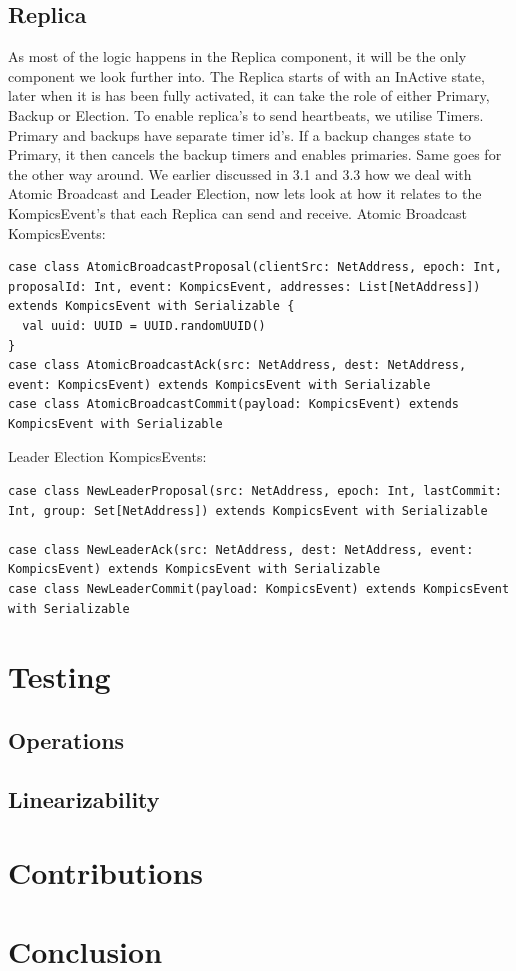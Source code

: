 \documentclass[12pt]{article}
\begin{document}
\subsection{Replica}
As most of the logic happens in the Replica component, it will be the only component we look further into.
\newline{}\newline{}
The Replica starts of with an InActive state, later when it is has been fully activated, it can take the role of either Primary, Backup or Election. To enable replica's to send heartbeats, we utilise Timers. Primary and backups have separate timer id's. If a backup changes state to Primary, it then cancels the backup timers and enables primaries. Same goes for the other way around. We earlier discussed in 3.1 and 3.3 how we deal with Atomic Broadcast and Leader Election, now lets look at how it relates to the KompicsEvent's that each Replica can send and receive.
\newline{}\newline{}
Atomic Broadcast KompicsEvents:
\begin{lstlisting}[style=myScalastyle]
case class AtomicBroadcastProposal(clientSrc: NetAddress, epoch: Int, proposalId: Int, event: KompicsEvent, addresses: List[NetAddress]) extends KompicsEvent with Serializable {
  val uuid: UUID = UUID.randomUUID()
}
case class AtomicBroadcastAck(src: NetAddress, dest: NetAddress, event: KompicsEvent) extends KompicsEvent with Serializable
case class AtomicBroadcastCommit(payload: KompicsEvent) extends KompicsEvent with Serializable

\end{lstlisting}
Leader Election KompicsEvents:
\begin{lstlisting}[style=myScalastyle]
case class NewLeaderProposal(src: NetAddress, epoch: Int, lastCommit: Int, group: Set[NetAddress]) extends KompicsEvent with Serializable

case class NewLeaderAck(src: NetAddress, dest: NetAddress, event: KompicsEvent) extends KompicsEvent with Serializable
case class NewLeaderCommit(payload: KompicsEvent) extends KompicsEvent with Serializable
\end{lstlisting}

\section{Testing}

\subsection{Operations}
\subsection{Linearizability}


\section{Contributions}

\section{Conclusion}



\end{document}
